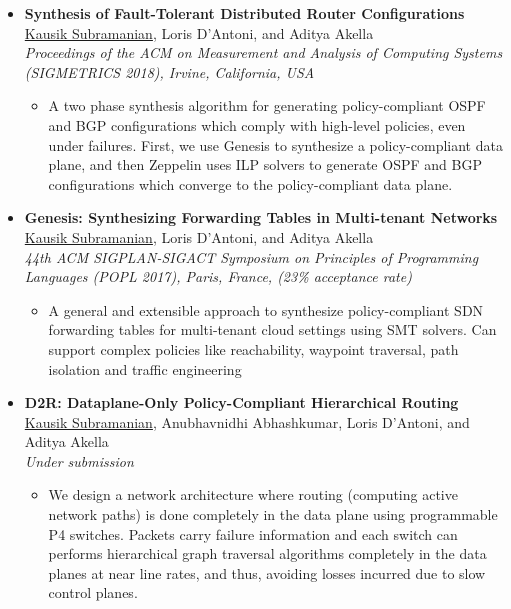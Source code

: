 \documentclass[11pt,a4paper,sans]{moderncv}        %
\begin{document}
\begin{itemize}
	\item \textbf{Synthesis of Fault-Tolerant Distributed Router
		Configurations} \\
\underline{Kausik Subramanian}, Loris D’Antoni, and Aditya Akella \\
	\emph{Proceedings of the ACM on Measurement and Analysis of Computing Systems (SIGMETRICS 2018), Irvine, California, USA}
	\begin{itemize}
		\item A two phase synthesis algorithm for generating policy-compliant
		OSPF and BGP configurations which comply with high-level policies, even
		under failures. First, we use Genesis to synthesize a policy-compliant
		data plane, and then Zeppelin uses ILP solvers to generate OSPF and BGP
		configurations which converge to the policy-compliant data plane.
	\end{itemize}
	\vspace*{4mm}

	\item \textbf{Genesis: Synthesizing Forwarding Tables in Multi-tenant Networks} \\
	\underline{Kausik Subramanian}, Loris D’Antoni, and Aditya Akella \\
	\emph{44th ACM SIGPLAN-SIGACT Symposium on Principles of Programming Languages (POPL 2017), Paris, France, (23\% acceptance rate)}
	\begin{itemize}
		\item A general and extensible approach to synthesize policy-compliant
		SDN forwarding tables for multi-tenant cloud settings using SMT solvers.
		Can support complex policies like reachability, waypoint traversal, path
		isolation and traffic engineering
	\end{itemize}
	\vspace*{4mm}

	\item \textbf{D2R: Dataplane-Only Policy-Compliant Hierarchical Routing} \\
	\underline{Kausik Subramanian}, Anubhavnidhi Abhashkumar, Loris D’Antoni, and Aditya Akella \\
	\emph{Under submission}
	\begin{itemize}
		\item We design a network architecture where routing (computing active
		network paths) is done completely in the data plane using programmable
		P4 switches. Packets carry failure information and each switch can
		performs hierarchical graph traversal algorithms completely in the data planes at near line
		rates, and thus, avoiding losses incurred due to slow control planes.
	\end{itemize}
\end{itemize}
\end{document}
